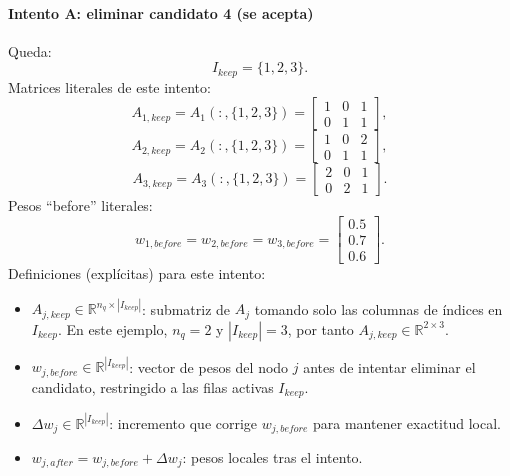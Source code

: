 \documentclass[11pt,a4paper]{article}
\begin{document}
\paragraph{Intento A: eliminar candidato 4 (se acepta)}
Queda:
\[
I_{keep}=\{1,2,3\}.
\]
Matrices literales de este intento:
\[
A_{1,keep}=A_1(:,\{1,2,3\})=
\begin{bmatrix}
1&0&1\\
0&1&1
\end{bmatrix},
\]
\[
A_{2,keep}=A_2(:,\{1,2,3\})=
\begin{bmatrix}
1&0&2\\
0&1&1
\end{bmatrix},
\]
\[
A_{3,keep}=A_3(:,\{1,2,3\})=
\begin{bmatrix}
2&0&1\\
0&2&1
\end{bmatrix}.
\]
Pesos ``before'' literales:
\[
w_{1,before}=w_{2,before}=w_{3,before}=
\begin{bmatrix}
0.5\\0.7\\0.6
\end{bmatrix}.
\]
Definiciones (explícitas) para este intento:
\begin{itemize}[leftmargin=1.5em]
\item $A_{j,keep}\in\mathbb{R}^{n_q\times |I_{keep}|}$:
submatriz de $A_j$ tomando solo las columnas de índices en $I_{keep}$.
En este ejemplo, $n_q=2$ y $|I_{keep}|=3$, por tanto
$A_{j,keep}\in\mathbb{R}^{2\times 3}$.
\item $w_{j,before}\in\mathbb{R}^{|I_{keep}|}$:
vector de pesos del nodo $j$ antes de intentar eliminar el candidato,
restringido a las filas activas $I_{keep}$.
\item $\Delta w_j\in\mathbb{R}^{|I_{keep}|}$:
incremento que corrige $w_{j,before}$ para mantener exactitud local.
\item $w_{j,after}=w_{j,before}+\Delta w_j$:
pesos locales tras el intento.
\end{itemize}
\end{document}
